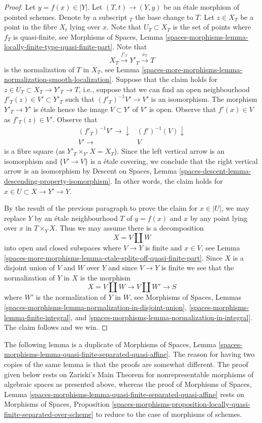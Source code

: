 \begin{proof}
\medskip\noindent
Let $y = f(x) \in |Y|$. Let $(T, t) \to (Y, y)$ be an \'etale morphism
of pointed schemes. Denote by a subscript ${}_T$ the base change to $T$.
Let $z \in X_T$ be a point in the fibre $X_t$ lying over $x$.
Note that $U_T \subset X_T$ is the set of points where $f_T$ is
quasi-finite, see Morphisms of Spaces, Lemma
\ref{spaces-morphisms-lemma-locally-finite-type-quasi-finite-part}.
Note that
$$
X_T \xrightarrow{f'_T} Y'_T \xrightarrow{\nu_T} T
$$
is the normalization of $T$ in $X_T$, see
Lemma \ref{spaces-more-morphisms-lemma-normalization-smooth-localization}.
Suppose that the claim holds for $z \in U_T \subset X_T \to Y'_T \to T$, i.e.,
suppose that we can find an open neighbourhood
$f'_T(z) \in V' \subset Y'_T$ such that $(f'_T)^{-1}V' \to V'$ is an
isomorphism. The morphism $Y'_T \to Y'$ is \'etale hence the image
$V \subset Y'$ of $V'$ is open. Observe that $f'(x) \in V$ as $f'_T(z) \in V'$.
Observe that
$$
\begin{array}{cc}(f'_T)^{-1}V' \longrightarrow\downarrow & (f')^{-1}(V) \downarrow \\ V' \longrightarrow & V\end{array}
$$
is a fibre square (as $Y'_T \times_{Y'} X = X_T$).
Since the left vertical arrow is an isomorphism
and $\{V' \to V\}$ is a \'etale covering, we conclude that the right vertical
arrow is an isomorphism by
Descent on Spaces, Lemma
\ref{spaces-descent-lemma-descending-property-isomorphism}.
In other words, the claim holds for $x \in U \subset X \to Y' \to Y$.

\medskip\noindent
By the result of the previous paragraph to prove the claim for
$x \in |U|$, we may replace $Y$ by an \'etale neighbourhood $T$ of
$y = f(x)$ and $x$ by any point lying over $x$ in $T \times_Y X$.
Thus we may assume there is a decomposition
$$
X = V \amalg W
$$
into open and closed subspaces where $V \to Y$ is finite and $x \in V$,
see Lemma \ref{spaces-more-morphisms-lemma-etale-splits-off-quasi-finite-part}.
Since $X$ is a disjoint union of $V$ and $W$ over $Y$ and since
$V \to Y$ is finite we see that the
normalization of $Y$ in $X$ is the morphism
$$
X = V \amalg W \longrightarrow V \amalg W' \longrightarrow S
$$
where $W'$ is the normalization of $Y$ in $W$, see
Morphisms of Spaces, Lemmas
\ref{spaces-morphisms-lemma-normalization-in-disjoint-union},
\ref{spaces-morphisms-lemma-finite-integral}, and
\ref{spaces-morphisms-lemma-normalization-in-integral}.
The claim follows and we win.
\end{proof}

The following lemma is a duplicate of
Morphisms of Spaces, Lemma
\ref{spaces-morphisms-lemma-quasi-finite-separated-quasi-affine}.
The reason for having two copies of the same lemma is that the
proofs are somewhat different. The proof given below
rests on Zariski's Main Theorem for nonrepresentable morphisms of
algebraic spaces as presented above, whereas the proof of
Morphisms of Spaces, Lemma
\ref{spaces-morphisms-lemma-quasi-finite-separated-quasi-affine}
rests on Morphisms of Spaces, Proposition
\ref{spaces-morphisms-proposition-locally-quasi-finite-separated-over-scheme}
to reduce to the case of morphisms of schemes.

